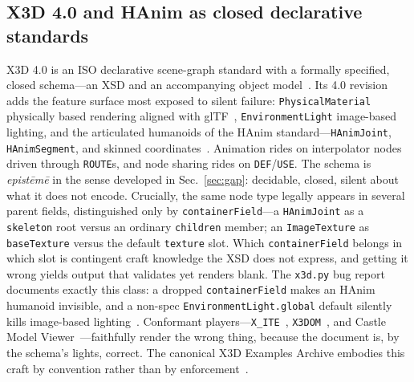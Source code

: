 \documentclass[sigconf,nonacm,screen,anonymous]{acmart}
\begin{document}
\subsection{X3D 4.0 and HAnim as closed declarative standards}
X3D 4.0 is an ISO declarative scene-graph standard with a formally specified, closed schema---an XSD and an accompanying object model~\cite{x3d4,x3duom}. Its 4.0 revision adds the feature surface most exposed to silent failure: \texttt{PhysicalMaterial} physically based rendering aligned with glTF~\cite{gltf}, \texttt{EnvironmentLight} image-based lighting, and the articulated humanoids of the HAnim standard---\texttt{HAnimJoint}, \texttt{HAnimSegment}, and skinned coordinates~\cite{hanim}. Animation rides on interpolator nodes driven through \texttt{ROUTE}s, and node sharing rides on \texttt{DEF}/\texttt{USE}. The schema is \emph{epistēmē} in the sense developed in Sec.~\ref{sec:gap}: decidable, closed, silent about what it does not encode. Crucially, the same node type legally appears in several parent fields, distinguished only by \texttt{containerField}---a \texttt{HAnimJoint} as a \texttt{skeleton} root versus an ordinary \texttt{children} member; an \texttt{ImageTexture} as \texttt{baseTexture} versus the default \texttt{texture} slot. Which \texttt{containerField} belongs in which slot is contingent craft knowledge the XSD does not express, and getting it wrong yields output that validates yet renders blank. The \texttt{x3d.py} bug report documents exactly this class: a dropped \texttt{containerField} makes an HAnim humanoid invisible, and a non-spec \texttt{EnvironmentLight.global} default silently kills image-based lighting~\cite{x3dpy}. Conformant players---\texttt{X\_ITE}~\cite{xite}, \texttt{X3DOM}~\cite{x3dom}, and Castle Model Viewer~\cite{castle}---faithfully render the wrong thing, because the document is, by the schema's lights, correct. The canonical X3D Examples Archive embodies this craft by convention rather than by enforcement~\cite{x3dexamples}.
\end{document}
